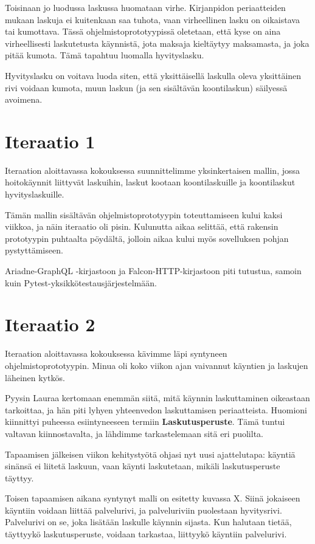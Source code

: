 Toisinaan jo luodussa laskussa huomataan virhe. Kirjanpidon
periaatteiden mukaan laskuja ei kuitenkaan saa tuhota, vaan virheellinen
lasku on oikaistava tai kumottava. Tässä ohjelmistoprototyypissä
oletetaan, että kyse on aina virheellisesti laskutetusta käynnistä, jota
maksaja kieltäytyy maksamasta, ja joka pitää kumota. Tämä tapahtuu
luomalla hyvityslasku.

Hyvityslasku on voitava luoda siten, että yksittäisellä laskulla oleva
yksittäinen rivi voidaan kumota, muun laskun (ja sen sisältävän
koontilaskun) säilyessä avoimena.

\hypertarget{iteraatio-1}{%
\section{Iteraatio 1}\label{iteraatio-1}}

Iteraation aloittavassa kokouksessa suunnittelimme yksinkertaisen
mallin, jossa hoitokäynnit liittyvät laskuihin, laskut kootaan
koontilaskuille ja koontilaskut hyvityslaskuille.

Tämän mallin sisältävän ohjelmistoprototyypin toteuttamiseen kului kaksi
viikkoa, ja näin iteraatio oli pisin. Kulunutta aikaa selittää, että
rakensin prototyypin puhtaalta pöydältä, jolloin aikaa kului myös
sovelluksen pohjan pystyttämiseen.

Ariadne-GraphQL -kirjastoon ja Falcon-HTTP-kirjastoon piti tutustua,
samoin kuin Pytest-yksikkötestausjärjestelmään.

\hypertarget{iteraatio-2}{%
\section{Iteraatio 2}\label{iteraatio-2}}

Iteraation aloittavassa kokouksessa kävimme läpi syntyneen
ohjelmistoprototyypin. Minua oli koko viikon ajan vaivannut käyntien ja
laskujen läheinen kytkös.

Pyysin Lauraa kertomaan enemmän siitä, mitä käynnin laskuttaminen
oikeastaan tarkoittaa, ja hän piti lyhyen yhteenvedon laskuttamisen
periaatteista. Huomioni kiinnittyi puheessa esiintyneeseen termiin
\textbf{Laskutusperuste}. Tämä tuntui valtavan kiinnostavalta, ja
lähdimme tarkastelemaan sitä eri puolilta.

Tapaamisen jälkeisen viikon kehitystyötä ohjasi nyt uusi ajattelutapa:
käyntiä sinänsä ei liitetä laskuun, vaan käynti laskutetaan, mikäli
laskutusperuste täyttyy.

Toisen tapaamisen aikana syntynyt malli on esitetty kuvassa X. Siinä
jokaiseen käyntiin voidaan liittää palvelurivi, ja palveluriviin
puolestaan hyvitysrivi. Palvelurivi on se, joka lisätään laskulle
käynnin sijasta. Kun halutaan tietää, täyttyykö laskutusperuste, voidaan
tarkastaa, liittyykö käyntiin palvelurivi.


